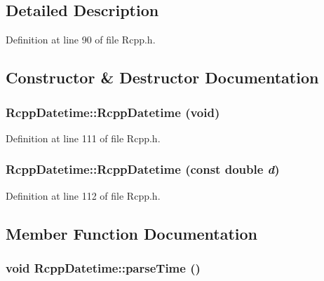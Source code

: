 \subsection{Detailed Description}


Definition at line 90 of file Rcpp.h.

\subsection{Constructor \& Destructor Documentation}
\hypertarget{classRcppDatetime_5a1679444e775781bf038553ef3b04ae}{
\subsubsection[RcppDatetime]{\setlength{\rightskip}{0pt plus 5cm}RcppDatetime::RcppDatetime (void)}}
\label{classRcppDatetime_5a1679444e775781bf038553ef3b04ae}




Definition at line 111 of file Rcpp.h.\hypertarget{classRcppDatetime_43972d46cd15e6cb666d61f13bdc31f2}{
\subsubsection[RcppDatetime]{\setlength{\rightskip}{0pt plus 5cm}RcppDatetime::RcppDatetime (const double {\em d})}}
\label{classRcppDatetime_43972d46cd15e6cb666d61f13bdc31f2}




Definition at line 112 of file Rcpp.h.

\subsection{Member Function Documentation}
\hypertarget{classRcppDatetime_a4b2eba45c4c02b5d334dd89e080b660}{
\subsubsection[parseTime]{\setlength{\rightskip}{0pt plus 5cm}void RcppDatetime::parseTime ()}}
\label{classRcppDatetime_a4b2eba45c4c02b5d334dd89e080b660}




